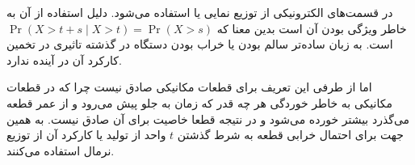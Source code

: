 \documentclass[]{article}
\begin{document}
\printheader

در قسمت‌های الکترونیکی از توزیع نمایی یا
استفاده می‌شود. دلیل استفاده از آن به خاطر ویژگی
بودن آن است بدین معنا که
$\Pr(X>t+s \mid X>t)=\Pr(X>s)$
است. به زبان ساده‌تر سالم بودن یا خراب بودن دستگاه در گذشته تاثیری در تخمین کارکرد آن در آینده ندارد.

اما از طرفی این تعریف برای قطعات مکانیکی صادق نیست چرا که در قطعات مکانیکی به خاطر خوردگی هر چه قدر که زمان
به جلو پیش می‌رود و از عمر قطعه می‌گذرد بیشتر خورده می‌شود و در نتیجه قطعا خاصیت
برای آن صادق نیست. به همین جهت برای احتمال خرابی قطعه به شرط گذشتن
$t$
واحد از تولید یا کارکرد آن از توزیع نرمال استفاده می‌کنند.
\end{document}

